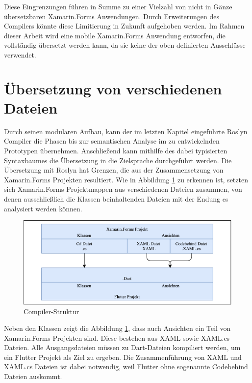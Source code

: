 Diese Eingrenzungen führen in Summe zu einer Vielzahl von nicht in Gänze übersetzbaren Xamarin.Forms Anwendungen.  Durch Erweiterungen des Compilers könnte diese Limitierung in Zukunft aufgehoben werden.  Im Rahmen dieser Arbeit wird eine mobile Xamarin.Forms Anwendung entworfen, die vollständig übersetzt werden kann, da sie keine der oben definierten Ausschlüsse verwendet. 


\section{Übersetzung von verschiedenen Dateien}
Durch seinen modularen Aufbau, kann der im letzten Kapitel eingeführte Roslyn Compiler die Phasen bis zur semantischen Analyse im zu entwickelnden Prototypen übernehmen.  Anschließend kann mithilfe des dabei typisierten Syntaxbaumes die Übersetzung in die Zielsprache durchgeführt werden.   Die Übersetzung mit Roslyn hat Grenzen,  die aus der Zusammensetzung von Xamarin.Forms Projekten resultiert.  Wie in Abbildung \ref{fig:CompilerStruktur} zu erkennen ist,  setzten sich Xamarin.Forms Projektmappen aus verschiedenen Dateien zusammen, von denen ausschließlich die Klassen beinhaltenden Dateien mit der Endung \glq cs\grq{}  analysiert werden können. 

\begin{figure}[!ht]
 \includegraphics[width=14.5cm]{Images/Compiler/CompilerArchitecture.png}
 \caption{Compiler-Struktur}
 \label{fig:CompilerStruktur}
\end{figure}

Neben den Klassen zeigt die Abbildung \ref{fig:CompilerStruktur},  dass auch Ansichten ein Teil von Xamarin.Forms Projekten sind.  Diese bestehen aus \glq XAML\grq{}  sowie \glq XAML.cs\grq{}  Dateien.  Alle Ausgangsdateien müssen zu Dart-Dateien kompiliert werden,  um ein Flutter Projekt als Ziel zu ergeben.  Die Zusammenführung von \glq XAML\grq{}  und \glq XAML.cs\grq{} Dateien ist dabei notwendig,  weil Flutter ohne sogenannte Codebehind Dateien auskommt. 

